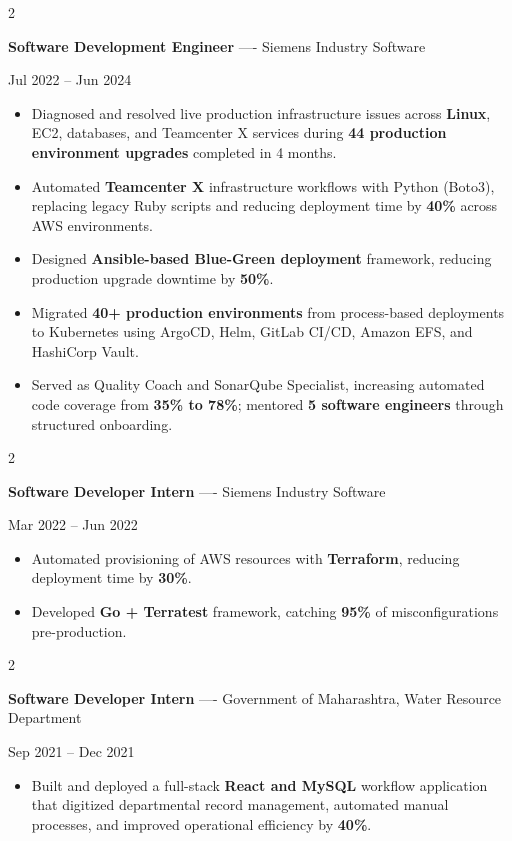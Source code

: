 \documentclass[10pt, letterpaper]{article}
\newenvironment{highlights}{
    \begin{itemize}[
        topsep=0.10 cm,
        parsep=0.06 cm,
        partopsep=0pt,
        itemsep=0.06 cm,
        leftmargin=12pt
    ]
}{
    \end{itemize}
}
\newenvironment{twocolentry}[2][]{
    \onecolentry
    \def\secondColumn{#2}
    \setcolumnwidth{\fill, 4.5 cm}
    \begin{paracol}{2}
}{
    \switchcolumn \raggedleft \secondColumn
    \end{paracol}
    \endonecolentry
}
\begin{document}
\vspace{0.15 cm}

\begin{twocolentry}{Jul 2022 -- Jun 2024}
\textbf{Software Development Engineer} ---- Siemens Industry Software
\end{twocolentry}
\begin{highlights}
  \item Diagnosed and resolved live production infrastructure issues across \textbf{Linux}, EC2, databases, and Teamcenter X services during \textbf{44 production environment upgrades} completed in 4 months.
  \item Automated \textbf{Teamcenter X} infrastructure workflows with Python (Boto3), replacing legacy Ruby scripts and reducing deployment time by \textbf{40\%} across AWS environments.
  \item Designed \textbf{Ansible-based Blue-Green deployment} framework, reducing production upgrade downtime by \textbf{50\%}.
  \item Migrated \textbf{40+ production environments} from process-based deployments to Kubernetes using ArgoCD, Helm, GitLab CI/CD, Amazon EFS, and HashiCorp Vault.
  \item Served as Quality Coach and SonarQube Specialist, increasing automated code coverage from \textbf{35\% to 78\%}; mentored \textbf{5 software engineers} through structured onboarding.
\end{highlights}

\vspace{0.15 cm}

\begin{twocolentry}{Mar 2022 -- Jun 2022}
\textbf{Software Developer Intern} ---- Siemens Industry Software
\end{twocolentry}
\begin{highlights}
  \item Automated provisioning of AWS resources with \textbf{Terraform}, reducing deployment time by \textbf{30\%}.
  \item Developed \textbf{Go + Terratest} framework, catching \textbf{95\%} of misconfigurations pre-production.
\end{highlights}

\vspace{0.15 cm}

\begin{twocolentry}{Sep 2021 -- Dec 2021}
\textbf{Software Developer Intern} ---- Government of Maharashtra, Water Resource Department
\end{twocolentry}
\begin{highlights}
  \item Built and deployed a full-stack \textbf{React and MySQL} workflow application that digitized departmental record management, automated manual processes, and improved operational efficiency by \textbf{40\%}.
\end{highlights}
\end{document}

